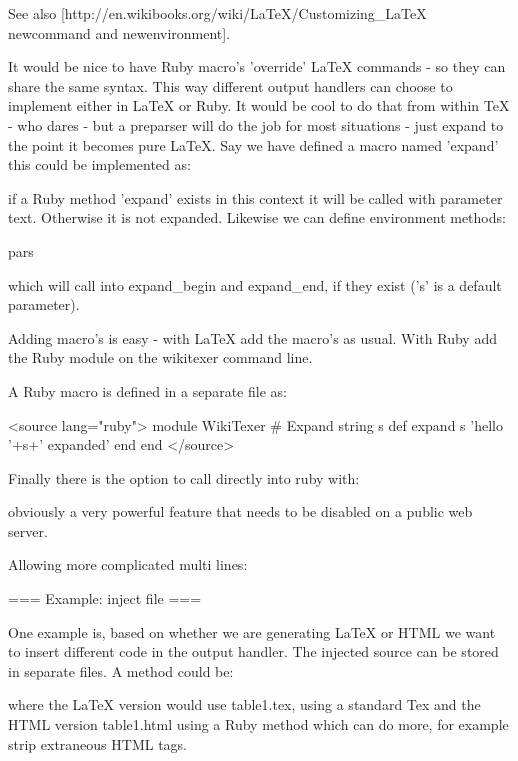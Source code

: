See also [http://en.wikibooks.org/wiki/LaTeX/Customizing_LaTeX newcommand and newenvironment].

It would be nice to have Ruby macro's 'override' LaTeX commands - so
they can share the same syntax. This way different output handlers can
choose to implement either in LaTeX or Ruby. It would be cool to do
that from within TeX - who dares - but a preparser will do the job for
most situations - just expand to the point it becomes pure LaTeX. Say
we have defined a macro named 'expand' this could be implemented as:


if a Ruby method 'expand' exists in this context it will be called
with parameter text. Otherwise it is not expanded. Likewise we can 
define environment methods:

  \begin{expand}[s]{pars}
	\end{expand}

which will call into expand_begin and expand_end, if they exist ('s'
is a default parameter).

Adding macro's is easy - with LaTeX add the macro's as usual. With
Ruby add the Ruby module on the wikitexer command line.

A Ruby macro is defined in a separate file as:

<source lang="ruby">
  module WikiTexer
		# Expand string s
		def expand s
			'hello '+s+' expanded'
		end
	end
</source>

Finally there is the option to call directly into ruby with:


obviously a very powerful feature that needs to be disabled on a public web server.

Allowing more complicated multi lines:



=== Example: inject file ===
  
One example is, based on whether we are generating LaTeX or HTML we
want to insert different code in the output handler. The injected
source can be stored in separate files. A method could be:


where the LaTeX version would use table1.tex, using a standard Tex
 and the HTML version table1.html using a Ruby method
which can do more, for example strip extraneous HTML tags.

